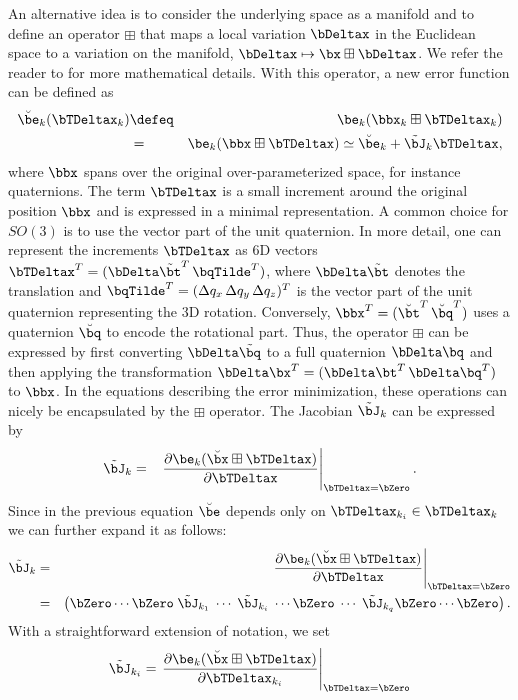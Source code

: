 \documentclass[a4paper]{article}
\begin{document}
An alternative idea is to consider the underlying space as a manifold
and to define an operator $\boxplus$ that maps a local variation
$\bDeltax$ in the Euclidean space to a variation on the manifold,
$\bDeltax\mapsto\bx\boxplus\bDeltax$.  We refer the reader to
\cite[\S1.3]{hertzberg08diplom} for more mathematical details. With
this operator, a new error function can be defined as
\begin{eqnarray}
\breve \be_{k}(\bTDeltax_k) &\defeq&
  \be_{k}(\bbx_k \boxplus \bTDeltax_k) \\
  &=& \be_{k}(\bbx \boxplus \bTDeltax) \label{eq:manifoldTaylor0}
  \simeq \breve \be_{k} + \tilde \bJ_{k} \bTDeltax,
\label{eq:manifoldTaylor}
\end{eqnarray}
where $\bbx$ spans over the original over-parameterized space, for
instance quaternions. The term $\bTDeltax$ is a small increment around
the original position $\bbx$ and is expressed in a minimal
representation. A common choice for $SO(3)$ is to use the vector part
of the unit quaternion.
%
In more detail, one can represent the increments $\bTDeltax$ as 6D vectors
$\bTDeltax^T = ( {\bDelta\tilde\bt}^T \, {\bqTilde}^T)$,
where $\bDelta \tilde \bt$ denotes the translation and $\bqTilde^T
= ( \Delta q_x \, \Delta q_y \, \Delta q_z)^T$ is the
vector part of the unit quaternion representing the 3D rotation.  Conversely, $\bbx^T=(
\breve \bt^T \, \breve \bq^T)$ uses a quaternion $\breve \bq$ to
encode the rotational part.  Thus, the operator $\boxplus$ can be
expressed by first converting $\bDelta \tilde \bq$ to a full quaternion $\bDelta
\bq$ and then applying the transformation $\bDelta \bx ^T = ( \bDelta
\bt^T \, \bDelta \bq^T)$ to $\bbx$.  In the equations
describing the error minimization, these operations can nicely be
encapsulated by the $\boxplus$ operator.  The Jacobian $\tilde
\bJ_{k}$ can be expressed by
\begin{eqnarray}
\tilde \bJ_{k} &=& \left. \frac{\partial \be_{k}(\breve{\bx} \boxplus \bTDeltax)} {\partial \bTDeltax} \right|_{\bTDeltax=\bZero}.
\label{eq:manifoldJacobian}
\end{eqnarray}
Since in the previous equation $\breve{\be}$ depends only on $\bTDeltax_{k_i} \in \bTDeltax_{k}$ we can further expand it as follows:
\begin{eqnarray}
\tilde \bJ_{k} &=&
\left.
\frac{\partial \be_{k}(\breve{\bx} \boxplus \bTDeltax)} {\partial \bTDeltax} \right|_{\bTDeltax=\bZero}\\
&=& \left(\bZero \cdots \bZero \; \tilde \bJ_{k_1} \; \cdots \; \tilde \bJ_{k_i} \;\cdots \bZero\; \cdots\;  \tilde \bJ_{k_q} \bZero \cdots \bZero \right).
\label{eq:manifoldJacobianSparse}
\end{eqnarray}
With a straightforward extension of notation, we set
\begin{equation}
\tilde \bJ_{k_i} = \left. \frac{ \partial \be_{k}(\breve{\bx} \boxplus \bTDeltax)}{\partial \bTDeltax_{k_i}} \right|_{\bTDeltax=\bZero}
\end{equation}
\end{document}
